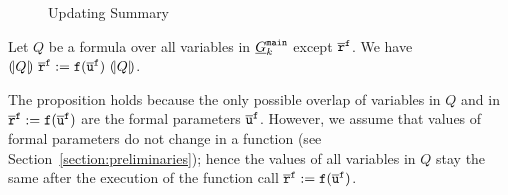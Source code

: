 \begin{figure}[t]
  \centering

  \caption{Updating Summary}
  \label{figure:updating-summary}
\end{figure}
\begin{proposition}
\label{propposition:invariant}
Let $Q$ be a formula over all variables in $\underline{G}^{\mathtt{{main}}}_k$ except $\mathtt{\overline{r}}^{\mathtt{{f}}}$.
We have $(\!| {Q} |\!)\
  \mathtt{\overline{r}}^{\mathtt{{f}}} := \mathtt{f}
  (\overline{\mathtt{u}}^{\mathtt{{f}}})\ (\!| {Q} |\!)$.
\end{proposition}
The proposition holds because the only possible overlap of variables in $Q$ and in $\mathtt{\overline{r}}^{\mathtt{{f}}} := \mathtt{f} (\overline{\mathtt{u}}^{\mathtt{{f}}})$ are the formal parameters $\overline{\mathtt{u}}^{\mathtt{{f}}}$. However, we assume that values of formal parameters do not change in a function (see Section~\ref{section:preliminaries}); hence the values of all variables in $Q$ stay the same after the execution of the function call $\mathtt{\overline{r}}^{\mathtt{{f}}} := \mathtt{f} (\overline{\mathtt{u}}^{\mathtt{{f}}})$.



